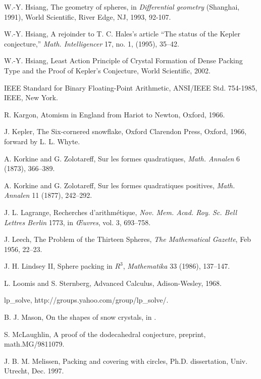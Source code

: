 \begin{thebibliography}{CHMS94}
 W.-Y. Hsiang, The geometry of spheres, in {\it Differential
    geometry} (Shanghai, 1991), World Scientific, River Edge, NJ,
    1993, 92-107.

 W.-Y. Hsiang, A rejoinder to T. C. Hales's article ``The status
    of the Kepler conjecture,'' {\it Math. Intelligencer} 17, no. 1, (1995),
    35--42.

 W.-Y. Hsiang, Least Action Principle of Crystal Formation
of Dense Packing Type and the Proof of Kepler's Conjecture, World
Scientific, 2002.

 IEEE Standard for Binary Floating-Point
Arithmetic, ANSI/IEEE Std. 754-1985, IEEE, New York.


 R. Kargon, Atomism in England from Hariot to Newton,
    Oxford, 1966.

 J. Kepler, The Six-cornered snowflake, Oxford Clarendon Press,
    Oxford, 1966,  forward by L. L. Whyte.

 A. Korkine and  G. Zolotareff, Sur les formes quadratiques,
    {\it Math. Annalen} 6 (1873), 366--389.

 A. Korkine and  G. Zolotareff, Sur les formes quadratiques
    positives, {\it Math. Annalen} 11 (1877), 242--292.

 J. L. Lagrange,  Recherches d'arithm\'etique, {\it Nov. Mem.
    Acad. Roy. Sc. Bell Lettres Berlin} 1773, in {\it \OE uvres}, vol. 3,
    693--758.

 J. Leech, The Problem of the Thirteen Spheres,
{\it The Mathematical Gazette}, Feb 1956, 22--23.

 J. H. Lindsey II, Sphere packing in $R^3$, {\it Mathematika}
    33 (1986), 137--147.

 L. Loomis and S. Sternberg, Advanced Calculus, Adison-Wesley, 1968.

 lp\_solve, http://groups.yahoo.com/group/lp\_solve/.

 B. J. Mason, On the shapes of snow crystals, in \cite{Kep66}.

 S. McLaughlin, A proof of the dodecahedral conjecture,
    preprint, math.MG/9811079.

 J. B. M. Melissen, Packing and covering with circles,
    Ph.D. dissertation, Univ. Utrecht, Dec. 1997.


\end{thebibliography}
